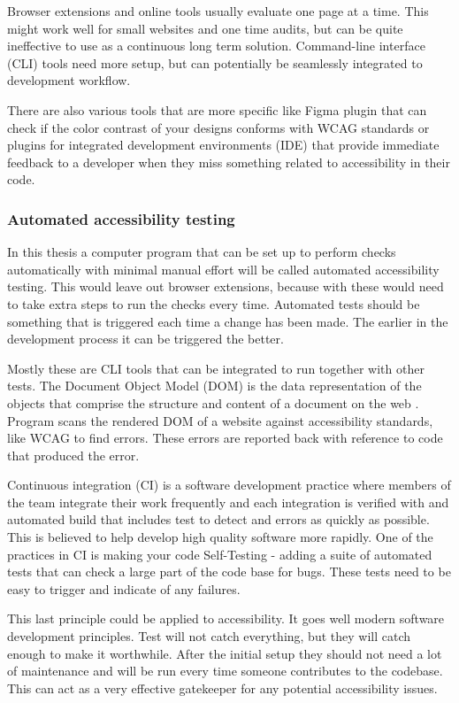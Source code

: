 \documentclass{master_thesis}
\begin{document}
Browser extensions and online tools usually evaluate one page at a time. This might work well for small websites and one time audits, but can be quite ineffective to use as a continuous long term solution. Command-line interface (CLI) tools need more setup, but can potentially be seamlessly integrated to development workflow.

There are also various tools that are more specific like Figma plugin that can check if the color contrast of your designs conforms with WCAG standards or plugins for integrated development environments (IDE) that provide immediate feedback to a developer when they miss something related to accessibility in their code.

\subsubsection{Automated accessibility testing}

In this thesis  a computer program that can be set up to perform checks automatically with minimal manual effort will be called automated accessibility testing. This would leave out browser extensions, because with these would need to take extra steps to run the checks every time. Automated tests should be something that is triggered each time a change has been made. The earlier in the development process it can be triggered the better.

Mostly these are CLI tools that can be integrated to run together with other tests. The Document Object Model (DOM) is the data representation of the objects that comprise the structure and content of a document on the web \citep{MDN2023}. Program scans the rendered DOM of a website against accessibility standards, like WCAG to find errors. These errors are reported back with reference to code that produced the error.

Continuous integration (CI) is a software development practice where members of the team integrate their work frequently and each integration is verified with and automated build that includes test to detect and errors as quickly as possible. This is believed to help develop high quality software more rapidly. One of the practices in CI is making your code Self-Testing - adding a suite of automated tests that can check a large part of the code base for bugs. These tests need to be easy to trigger and indicate of any failures.
\citep{Fowler2006}

This last principle could be applied to accessibility. It goes well modern software development principles. Test will not catch everything, but they will catch enough to make it worthwhile. After the initial setup they should not need a lot of maintenance and will be run every time someone contributes to the codebase. This can act as a very effective gatekeeper for any potential accessibility issues.
\end{document}

